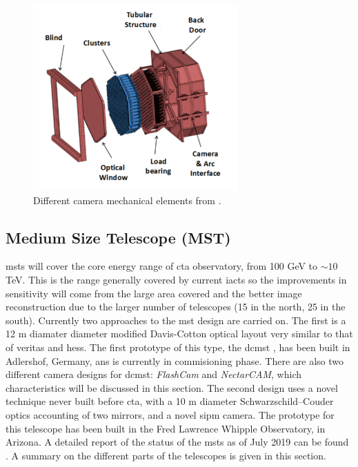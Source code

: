 \documentclass[main.tex]{subfiles}
\begin{document}
\begin{figure}
\centering
 \includegraphics[width=0.7\textwidth]{Pictures/LSTcamerastructure.pdf}
  \caption{Different camera mechanical elements from \cite{2013LSTCamMech}.}
    \label{fig:LSTcammech}
\end{figure}

\subsection{Medium Size Telescope (MST)} \label{sec:MST}

\glspl{mst} will cover the core energy range of \gls{cta} observatory, from 100 GeV to $\sim 10$TeV. This is the range generally covered  by current \glspl{iact} so the improvements in sensitivity will come from the large area covered and the better image reconstruction due to the larger number of telescopes (15 in the north, 25 in the south).
Currently two approaches to the \gls{mst} design are carried on. The first is a 12 m diamater diameter modified Davis-Cotton optical layout very similar to that of \gls{veritas} and \gls{hess}. The first prototype of this type, the \gls{dcmst} \cite{2017SCMSTstatus}, has been built in Adlershof, Germany, ans is currently in commisioning phase. There are also two different camera designs for \gls{dcmst}: \textit{FlashCam} and \textit{NectarCAM}, which characteristics will be discussed in this section.
The second design uses a novel technique never built before \gls{cta}, with a 10 m diameter Schwarzschild–Couder \cite{2017SCMSTstatus} optics accounting of two mirrors, and a novel \gls{sipm} camera. The prototype for this telescope has been built in the Fred Lawrence Whipple Observatory, in Arizona. 
A detailed report of the status of the \glspl{mst} as of July 2019 can be found \cite{2019MSTreport}. A summary on the different parts of the telescopes is given in this section.
\end{document}
